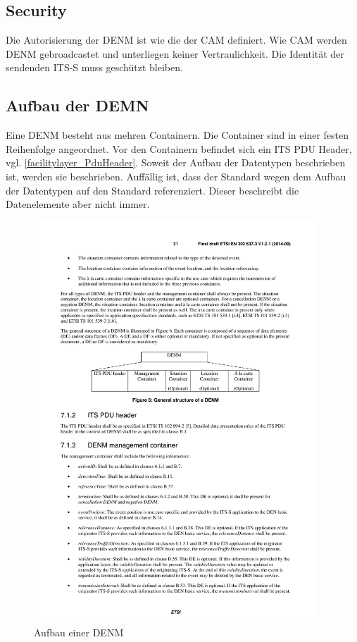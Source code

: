 \subsection{Security}
Die Autorisierung der \ac{DENM} ist wie die der \ac{CAM} definiert. Wie \ac{CAM} werden \ac{DENM} gebroadcastet und unterliegen keiner Vertraulichkeit. Die Identität der sendenden \ac{ITS-S} muss geschützt bleiben.

\subsection{Aufbau der DEMN}
Eine \ac{DENM} besteht aus mehren Containern. Die Container sind in einer festen Reihenfolge angeordnet.  Vor den Containern befindet sich ein \ac{ITS} PDU Header, vgl. \autoref{facilitylayer_PduHeader}. Soweit der Aufbau der Datentypen beschrieben ist, werden sie beschrieben. Auffällig ist, dass der Standard \cite{en302637-3} wegen dem Aufbau der Datentypen auf den Standard \cite{ts102894-2} referenziert. Dieser beschreibt die Datenelemente aber nicht immer.

\begin{figure}[htbp]
	\includegraphics[width=0.95\textwidth]{content/images/04_facilitylayer/denmAufbau.pdf}
	\caption{Aufbau einer DENM \cite{en302637-3}}
	\label{fig:darstellungdenmAufbau}
\end{figure}

